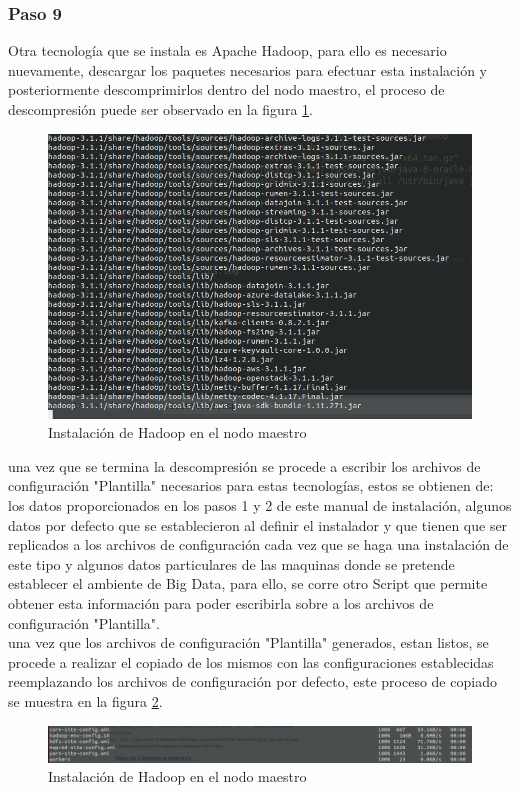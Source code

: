 \subsubsection{Paso 9}
Otra tecnología que se instala es Apache Hadoop, para ello es necesario nuevamente, descargar los paquetes necesarios para efectuar esta instalación y posteriormente descomprimirlos dentro del nodo maestro, el proceso de descompresión puede ser observado en la figura \ref{fig:hadoopmaestro}.
\\
\begin{figure}[H]
	\hypertarget{fig:hadoopmaestro}{\hspace{1pt}}
	\begin{center}	
		\includegraphics[width=.7\textwidth]{capitulo5/images/instalacionhadoopmaestro.png}
		\caption{Instalación de Hadoop en el nodo maestro}
		\label{fig:hadoopmaestro}
	\end{center}
\end{figure}
una vez que se termina la descompresión se procede a escribir los archivos de configuración "Plantilla" necesarios para estas tecnologías, estos se obtienen de: los datos proporcionados en los pasos 1 y 2 de este manual de instalación, algunos datos por defecto que se establecieron al definir el instalador y que tienen que ser replicados a los archivos de configuración cada vez que se haga una instalación de este tipo y algunos datos particulares de las maquinas donde se pretende establecer el ambiente de Big Data, para ello, se corre otro Script que permite obtener esta información para poder escribirla sobre a los archivos de configuración "Plantilla".
\\
una vez que los archivos de configuración "Plantilla" generados, estan listos, se procede a realizar el copiado de los mismos con las configuraciones establecidas reemplazando los archivos de configuración por defecto, este proceso de copiado se muestra en la figura \ref{fig:copiado}.
\begin{figure}[H]
	\hypertarget{fig:copiado}{\hspace{1pt}}
	\begin{center}	
		\includegraphics[width=.7\textwidth]{capitulo5/images/configuracionhadoopesclavo.png}
		\caption{Instalación de Hadoop en el nodo maestro}
		\label{fig:copiado}
	\end{center}
\end{figure}
